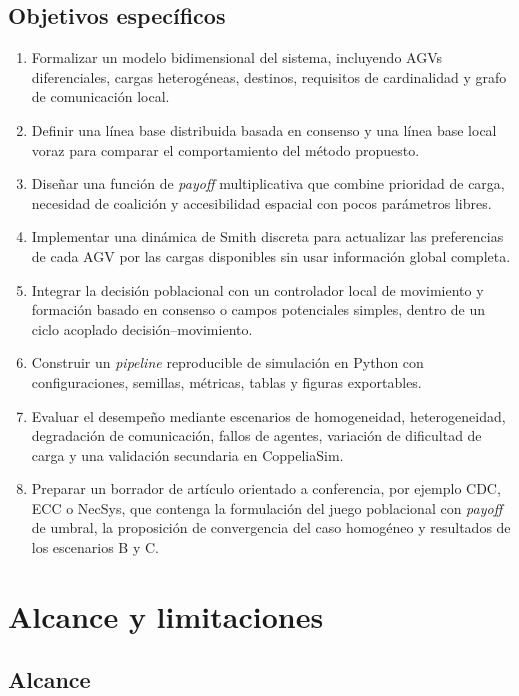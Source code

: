 \documentclass[11pt,a4paper]{article}
\begin{document}
\subsection{Objetivos específicos}

\begin{enumerate}
  \item Formalizar un modelo bidimensional del sistema, incluyendo AGVs diferenciales, cargas heterogéneas, destinos, requisitos de cardinalidad y grafo de comunicación local.
  \item Definir una línea base distribuida basada en consenso y una línea base local voraz para comparar el comportamiento del método propuesto.
  \item Diseñar una función de \textit{payoff} multiplicativa que combine prioridad de carga, necesidad de coalición y accesibilidad espacial con pocos parámetros libres.
  \item Implementar una dinámica de Smith discreta para actualizar las preferencias de cada AGV por las cargas disponibles sin usar información global completa.
  \item Integrar la decisión poblacional con un controlador local de movimiento y formación basado en consenso o campos potenciales simples, dentro de un ciclo acoplado decisión--movimiento.
  \item Construir un \textit{pipeline} reproducible de simulación en Python con configuraciones, semillas, métricas, tablas y figuras exportables.
  \item Evaluar el desempeño mediante escenarios de homogeneidad, heterogeneidad, degradación de comunicación, fallos de agentes, variación de dificultad de carga y una validación secundaria en CoppeliaSim.
  \item Preparar un borrador de artículo orientado a conferencia, por ejemplo CDC, ECC o NecSys, que contenga la formulación del juego poblacional con \textit{payoff} de umbral, la proposición de convergencia del caso homogéneo y resultados de los escenarios B y C.
\end{enumerate}

\section{Alcance y limitaciones}

\subsection{Alcance}
\end{document}
